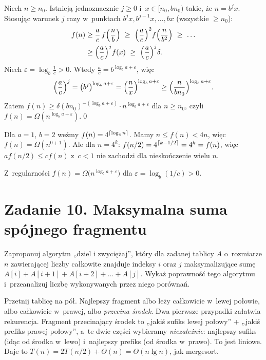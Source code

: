 \documentclass[11pt]{article}
\begin{document}
Niech $n\ge n_0$. Istnieją jednoznacznie $j\ge0$ i~$x\in[n_0,bn_0)$ takie, że
$n=b^jx$. Stosując warunek $j$ razy w~punktach $b^jx,b^{j-1}x,\dots,bx$ (wszystkie
$\ge n_0$):
\begin{align*}
f(n)&\ge \frac ac\,f\Bigl(\frac nb\Bigr)\ \ge\ \Bigl(\frac ac\Bigr)^2f\Bigl(\frac n{b^2}\Bigr)\ \ge\ \dots\\
&\ge \Bigl(\frac ac\Bigr)^jf(x)\ \ge\ \Bigl(\frac ac\Bigr)^j\delta.
\end{align*}
Niech $\varepsilon=\log_b\frac1c>0$. Wtedy $\frac ac=b^{\log_ba+\varepsilon}$, więc
\[
\Bigl(\frac ac\Bigr)^j=\bigl(b^j\bigr)^{\log_ba+\varepsilon}=\Bigl(\frac nx\Bigr)^{\log_ba+\varepsilon}
\ge\Bigl(\frac{n}{bn_0}\Bigr)^{\log_ba+\varepsilon}.
\]
Zatem $f(n)\ge\delta(bn_0)^{-(\log_ba+\varepsilon)}\cdot n^{\log_ba+\varepsilon}$
dla $n\ge n_0$, czyli $f(n)=\Omega(n^{\log_ba+\varepsilon})$.\qed

\begin{uwaga}
Dla $a=1$, $b=2$ weźmy $f(n)=4^{\left\lceil \log_4n \right\rceil}$. Mamy $n\le f(n)<4n$, więc
$f(n)=\Omega(n^{0+1})$. Ale dla $n=4^k$: $f(n/2)=4^{\left\lceil k-1/2 \right\rceil}=4^k=f(n)$,
więc $af(n/2)\le cf(n)$ z~$c<1$ nie zachodzi dla nieskończenie wielu $n$.
\end{uwaga}
\begin{odpowiedz}
Z~regularności $f(n)=\Omega\bigl(n^{\log_ba+\varepsilon}\bigr)$ dla $\varepsilon=\log_b(1/c)>0$.
\end{odpowiedz}

\section{Zadanie 10. Maksymalna suma spójnego fragmentu}
\begin{tresc}
Zaproponuj algorytm „dziel i zwyciężaj”, który dla zadanej tablicy $A$
o~rozmiarze $n$ zawierającej liczby całkowite znajduje indeksy $i$ oraz $j$
maksymalizujące sumę $A[i]+A[i+1]+A[i+2]+\ldots+A[j]$.
Wykaż poprawność tego algorytmu i~przeanalizuj liczbę wykonywanych przez niego porównań.
\end{tresc}

\begin{intuicja}
Przetnij tablicę na pół. Najlepszy fragment albo leży całkowicie w~lewej
połowie, albo całkowicie w~prawej, albo \emph{przecina środek}. Dwa pierwsze
przypadki załatwia rekurencja. Fragment przecinający środek to „jakiś
sufiks lewej połowy” + „jakiś prefiks prawej połowy”, a~te dwie części
wybieramy \emph{niezależnie}: najlepszy sufiks (idąc od środka w~lewo)
i~najlepszy prefiks (od środka w~prawo). To jest liniowe. Daje to
$T(n)=2T(n/2)+\Theta(n)=\Theta(n\lg n)$, jak mergesort.
\end{intuicja}
\end{document}
